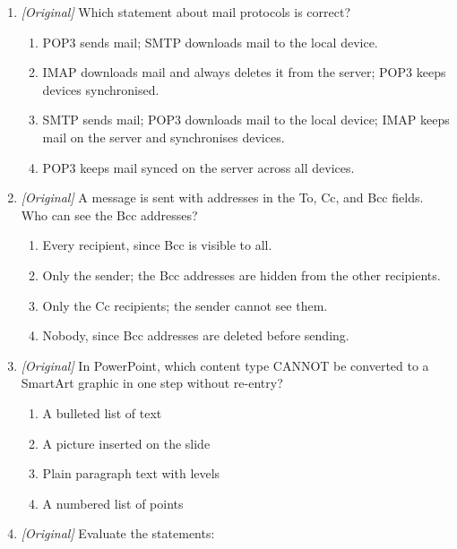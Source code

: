 \documentclass[11pt]{article}
\begin{document}
\begin{enumerate}[label=\textbf{Q\arabic*.}, leftmargin=*]
\begin{enumerate}[label=\Alph*.]
    \item Point-to-Point Protocol version 3
    \item Post Office Protocol version 3
    \item Packet Ordering Protocol version 3
    \item Private Office Protocol version 3
  \end{enumerate}
\item \textit{[Original]} Which statement about mail protocols is correct?
  \begin{enumerate}[label=\Alph*.]
    \item POP3 sends mail; SMTP downloads mail to the local device.
    \item IMAP downloads mail and always deletes it from the server; POP3
      keeps devices synchronised.
    \item SMTP sends mail; POP3 downloads mail to the local device; IMAP keeps
      mail on the server and synchronises devices.
    \item POP3 keeps mail synced on the server across all devices.
  \end{enumerate}
\item \textit{[Original]} A message is sent with addresses in the To, Cc, and
  Bcc fields. Who can see the Bcc addresses?
  \begin{enumerate}[label=\Alph*.]
    \item Every recipient, since Bcc is visible to all.
    \item Only the sender; the Bcc addresses are hidden from the other
      recipients.
    \item Only the Cc recipients; the sender cannot see them.
    \item Nobody, since Bcc addresses are deleted before sending.
  \end{enumerate}
\item \textit{[Original]} In PowerPoint, which content type CANNOT be converted
  to a SmartArt graphic in one step without re-entry?
  \begin{enumerate}[label=\Alph*.]
    \item A bulleted list of text
    \item A picture inserted on the slide
    \item Plain paragraph text with levels
    \item A numbered list of points
  \end{enumerate}
\item \textit{[Original]} Evaluate the statements:

\end{enumerate}
\end{document}
